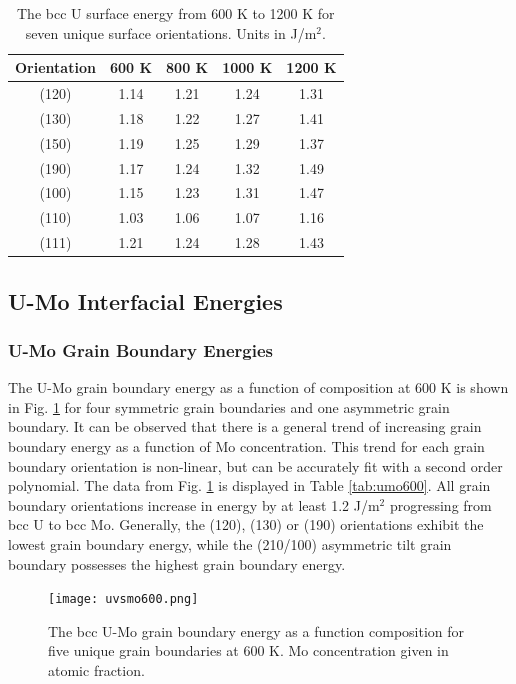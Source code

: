 \documentclass[review]{elsarticle}
\begin{document}
\begin{table}[h]
\caption{The bcc U surface energy from 600 K to 1200 K for seven unique surface orientations. Units in J/m$^{2}$. } \label{tab:usurf}
\begin{center}
\begin{tabular}{|c|c|c|c|c|}
	\hline
	Orientation & 600 K & 800 K & 1000 K & 1200 K \\
	 \hline
	 (120) & 1.14 & 1.21 & 1.24 & 1.31 \\
	 (130) & 1.18 & 1.22 & 1.27 & 1.41 \\
	 (150) & 1.19 & 1.25 & 1.29 & 1.37 \\
	 (190) & 1.17 & 1.24 & 1.32 & 1.49 \\
 (100) & 1.15 & 1.23 & 1.31 & 1.47 \\
	 (110) & 1.03 & 1.06 & 1.07 & 1.16 \\
	 (111) & 1.21 & 1.24 & 1.28 & 1.43 \\	 
	 \hline
\end{tabular}
\end{center}
\label{default}
\end{table}

\FloatBarrier

\subsection{U-Mo Interfacial Energies}
\subsubsection{U-Mo Grain Boundary Energies}

The U-Mo grain boundary energy as a function of composition at 600 K is shown in Fig. \ref{fig:umo600} for four symmetric grain boundaries and one asymmetric grain boundary. It can be observed that there is a general trend of increasing grain boundary energy as a function of Mo concentration. This trend for each grain boundary orientation is non-linear, but can be accurately fit with a second order polynomial. The data from Fig. \ref{fig:umo600} is displayed in Table \ref{tab:umo600}. All grain boundary orientations increase in energy by at least 1.2 J/m$^{2}$ progressing from bcc U to bcc Mo. Generally, the (120), (130) or (190) orientations exhibit the lowest grain boundary energy, while the (210/100) asymmetric tilt grain boundary possesses the highest grain boundary energy. 

\begin{figure}[h]
 \centering
 \texttt{[image: uvsmo600.png]} 
 \caption{The bcc U-Mo grain boundary energy as a function composition for five unique grain boundaries at 600 K. Mo concentration given in atomic fraction.}
 \label{fig:umo600}
\end{figure}
\end{document}
